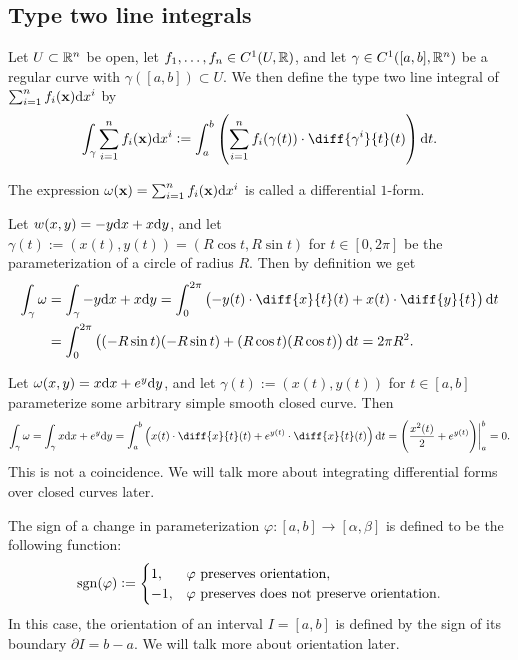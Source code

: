 \documentclass[11pt,a4paper]{article}
\begin{document}
\subsection{Type two line integrals}

\begin{definition}
  Let $U \subset \mathbb{R}^n$ be open,
  let $f_1,\dots,f_n \in C^1(U,\mathbb{R})$,
  and let $\gamma \in C^1([a,b],\mathbb{R}^n)$ be a regular curve
  with $\gamma([a,b]) \subset U$.
  We then define the type two line integral
  of $\sum_{i=1}^{n} f_i(\vec x) \dx^i$ by
  \[
    \int_{\gamma} \sum_{i=1}^{n} f_i(\vec x) \dx^i :=
    \int_{a}^{b}
      \del{\sum_{i=1}^{n} f_i(\gamma(t)) \cdot \diff{\gamma^i}{t}(t)} \dt.
  \]
\end{definition}
\begin{remark}
  The expression $\omega(\vec x) = \sum_{i=1}^{n} f_i(\vec x) \dx^i$
  is called a differential $1$-form.
\end{remark}

\begin{example}
  Let $w(x,y) = -y \dx + x \dy$,
  and let $\gamma(t) := (x(t),y(t)) = (R\cos t, R\sin t)$ for $t \in [0,2\pi]$
  be the parameterization of a circle of radius $R$.
  Then by definition we get
  \begin{align*}
    \int_{\gamma} \omega &=
    \int_{\gamma} -y \dx + x \dy =
    \int_{0}^{2\pi} \del{-y(t) \cdot \diff{x}{t}(t) + x(t) \cdot \diff{y}{t}} \dt \\ &=
    \int_{0}^{2\pi} \del{(-R\sin t)(-R\sin t) + (R\cos t)(R\cos t)} \dt =
    2\pi R^2.
  \end{align*}
\end{example}

\begin{example}
  Let $\omega(x,y) = x \dx + e^y \dy$,
  and let $\gamma(t) := (x(t),y(t))$ for $t \in [a,b]$
  parameterize some arbitrary simple smooth closed curve.
  Then
  \[
    \int_{\gamma} \omega =
    \int_{\gamma} x \dx + e^y \dy =
    \int_{a}^{b} \del{x(t) \cdot \diff{x}{t}(t) +
      e^{y(t)} \cdot \diff{x}{t}(t)} \dt =
    \del{\frac{x^2(t)}{2} + e^{y(t)}} \biggr\vert^b_a = 0.
  \]
  This is not a coincidence.
  We will talk more about integrating differential forms over closed
  curves later.
\end{example}

\begin{definition}[Sign]
  The sign of a change
  in parameterization $\varphi \colon [a,b] \to [\alpha,\beta]$
  is defined to be the following function:
  \[
    \operatorname{sgn}(\varphi) :=
    \begin{cases}
      1, &\text{$\varphi$ preserves orientation}, \\
      -1, &\text{$\varphi$ preserves does not preserve orientation}.
    \end{cases}
  \]
  In this case, the orientation of an interval $I = [a,b]$
  is defined by the sign of its boundary $\partial I = b - a$.
  We will talk more about orientation later.
\end{definition}
\end{document}
